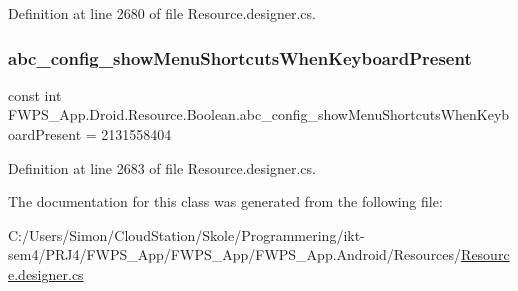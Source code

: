Definition at line 2680 of file Resource.\+designer.\+cs.

\mbox{\label{class_f_w_p_s___app_1_1_droid_1_1_resource_1_1_boolean_abc20ea7f1566fc4263c2db30fe0e7a38}} 
\subsubsection{\texorpdfstring{abc\+\_\+config\+\_\+show\+Menu\+Shortcuts\+When\+Keyboard\+Present}{abc\_config\_showMenuShortcutsWhenKeyboardPresent}}
{\footnotesize\ttfamily const int F\+W\+P\+S\+\_\+\+App.\+Droid.\+Resource.\+Boolean.\+abc\+\_\+config\+\_\+show\+Menu\+Shortcuts\+When\+Keyboard\+Present = 2131558404}



Definition at line 2683 of file Resource.\+designer.\+cs.



The documentation for this class was generated from the following file\+:\begin{DoxyCompactItemize}
\item 
C\+:/\+Users/\+Simon/\+Cloud\+Station/\+Skole/\+Programmering/ikt-\/sem4/\+P\+R\+J4/\+F\+W\+P\+S\+\_\+\+App/\+F\+W\+P\+S\+\_\+\+App/\+F\+W\+P\+S\+\_\+\+App.\+Android/\+Resources/\mbox{\hyperlink{_resource_8designer_8cs}{Resource.\+designer.\+cs}}\end{DoxyCompactItemize}
